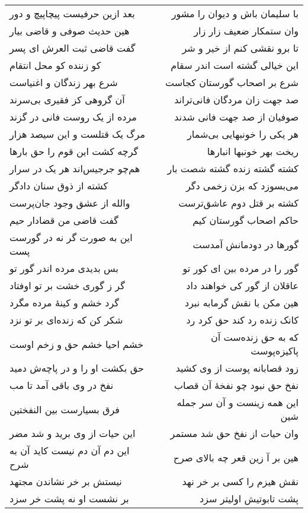 \begin{center}
\begin{longtable}{l p{0.5cm} r}
\\
بعد ازین حرفیست پیچاپیچ و دور
&&
با سلیمان باش و دیوان را مشور
\\
هین حدیث صوفی و قاضی بیار
&&
وان ستمکار ضعیف زار زار
\\
گفت قاضی ثبت العرش ای پسر
&&
تا برو نقشی کنم از خیر و شر
\\
کو زننده کو محل انتقام
&&
این خیالی گشته است اندر سقام
\\
شرع بهر زندگان و اغنیاست
&&
شرع بر اصحاب گورستان کجاست
\\
آن گروهی کز فقیری بی‌سرند
&&
صد جهت زان مردگان فانی‌تراند
\\
مرده از یک روست فانی در گزند
&&
صوفیان از صد جهت فانی شدند
\\
مرگ یک قتلست و این سیصد هزار
&&
هر یکی را خونبهایی بی‌شمار
\\
گرچه کشت این قوم را حق بارها
&&
ریخت بهر خونبها انبارها
\\
هم‌چو جرجیس‌اند هر یک در سرار
&&
کشته گشته زنده گشته شصت بار
\\
کشته از ذوق سنان دادگر
&&
می‌بسوزد که بزن زخمی دگر
\\
والله از عشق وجود جان‌پرست
&&
کشته بر قتل دوم عاشق‌ترست
\\
گفت قاضی من قضادار حیم
&&
حاکم اصحاب گورستان کیم
\\
این به صورت گر نه در گورست پست
&&
گورها در دودمانش آمدست
\\
بس بدیدی مرده اندر گور تو
&&
گور را در مرده بین ای کور تو
\\
گر ز گوری خشت بر تو اوفتاد
&&
عاقلان از گور کی خواهند داد
\\
گرد خشم و کینهٔ مرده مگرد
&&
هین مکن با نقش گرمابه نبرد
\\
شکر کن که زنده‌ای بر تو نزد
&&
کانک زنده رد کند حق کرد رد
\\
خشم احیا خشم حق و زخم اوست
&&
که به حق زنده‌ست آن پاکیزه‌پوست
\\
حق بکشت او را و در پاچه‌ش دمید
&&
زود قصابانه پوست از وی کشید
\\
نفخ در وی باقی آمد تا مب
&&
نفخ حق نبود چو نفخهٔ آن قصاب
\\
فرق بسیارست بین النفختین
&&
این همه زینست و آن سر جمله شین
\\
این حیات از وی برید و شد مضر
&&
وان حیات از نفخ حق شد مستمر
\\
این دم آن دم نیست کاید آن به شرح
&&
هین بر آ زین قعر چه بالای صرح
\\
نیستش بر خر نشاندن مجتهد
&&
نقش هیزم را کسی بر خر نهد
\\
بر نشست او نه پشت خر سزد
&&
پشت تابوتیش اولیتر سزد

\end{longtable}
\end{center}
